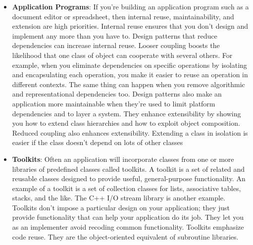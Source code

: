 \documentclass{report}
\begin{document}
\begin{itemize}
\begin{enumerate}
\begin{itemize}
                    \end{itemize}
                \item Inability to alter classes conveniently. Sometimes you have to modify a class that can't be modified conveniently. Perhaps you need the source code and don't have it (as may be the case with a commercial class library). Or maybe any change would require modifying lots of existing subclasses. Design patterns offer ways to modify classes in such circumstances.
                    \begin{itemize}
                        \item \textbf{Design patterns}: Adapter (157), Decorator (196), Visitor (366).
                    \end{itemize}
            \end{enumerate}
        \item \textbf{Application Programs}: 
            If you're building an application program such as a document editor or spreadsheet, then internal reuse, maintainability, and extension are high priorities. Internal reuse ensures that you don't design and implement any more than you have to. Design patterns that reduce dependencies can increase internal reuse. Looser coupling boosts the likelihood that one class of object can cooperate with several others. For example, when you eliminate dependencies on specific operations by isolating and encapsulating each operation, you make it easier to reuse an operation in different contexts. The same thing can happen when you remove algorithmic and representational dependencies too.
            \bigbreak \noindent 
            Design patterns also make an application more maintainable when they're used to limit platform dependencies and to layer a system. They enhance extensibility by showing you how to extend class hierarchies and how to exploit object composition. Reduced coupling also enhances extensibility. Extending a class in isolation is easier if the class doesn't depend on lots of other classes
        \item \textbf{Toolkits}: Often an application will incorporate classes from one or more libraries of predefined classes called toolkits. A toolkit is a set of related and reusable classes designed to provide useful, general-purpose functionality. An example of a toolkit is a set of collection classes for lists, associative tables, stacks, and the like. The C++ I/O stream library is another example. Toolkits don't impose a particular design on your application; they just provide functionality that can help your application do its job. They let you as an implementer avoid recoding common functionality. Toolkits emphasize code reuse. They are the object-oriented equivalent of subroutine libraries.

\end{itemize}
\end{document}
